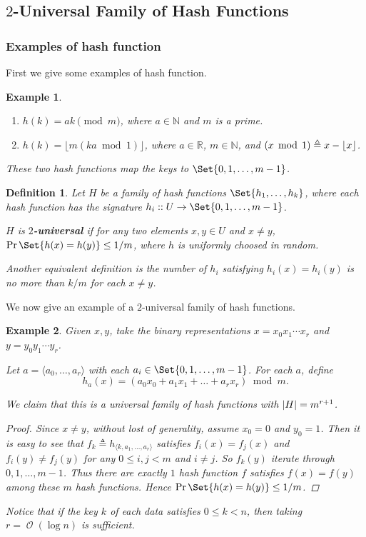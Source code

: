 \documentclass[12pt, a4paper]{article}
\DeclarePairedDelimiter{\abs}{\lvert}{\rvert}
\DeclarePairedDelimiter{\floor}{\lfloor}{\rfloor}
\newcommand{\ord}{\operatorname{\mathcal{O}}}
\newcommand{\defeq}{\triangleq}
\DeclareMathOperator{\mmod}{\;mod\;}
\theoremstyle{mystyle} %
\newtheorem{definition}{Definition}
\newtheorem{example}{Example}
\begin{document}
\subsection{$2$-Universal Family of Hash Functions}

\subsubsection{Examples of hash function}
First we give some examples of hash function.

\begin{example} \hfill
\begin{enumerate}
  \item $h(k) = a k \pmod{m}$, where $a \in \mathbb{N}$ and $m$ is a prime.
  \item $h(k) = \lfloor m (k a \mmod 1) \rfloor$, where $a \in \mathbb{R}$, $m \in \mathbb{N}$,
    and $(x \mmod 1) \defeq x - \floor{x}$.
\end{enumerate}
These two hash functions map the keys to $\Set{0, 1, \dots, m-1}$.
\end{example}

\smallskip

\begin{definition}
  Let $H$ be a family of hash functions $\Set{ h_1, \dots, h_k }$,
  where each hash function has the signature $h_i :: U \to \Set{0, 1, \dots, m-1}$.

  $H$ is {\bf $2$-universal} if for any two elements $x, y \in U$ and $x \neq y$, $\Pr\Set{ h(x) = h(y) } \leq 1/m$,
  where $h$ is uniformly choosed in random.

  Another equivalent definition is
  the number of $h_i$ satisfying $h_i(x) = h_i(y)$ is no more than $k / m$ for each $x \neq y$.
\end{definition}

We now give an example of a $2$-universal family of hash functions.

\begin{example}
  Given $x, y$, take the binary representations
  $x = x_0 x_1 \dotsm x_r$ and $y = y_0 y_1 \dotsm y_r$.

  Let $a = \langle a_0, \dots, a_r \rangle$ with each $a_i \in \Set{0, 1, \dots, m-1}$.
  For each $a$, define
  \[ h_a(x) = (a_0 x_0 + a_1 x_1 + \dots + a_r x_r) \mmod m. \]

  We claim that this is a universal family of hash functions with $\abs{H} = m^{r+1}$.

  \begin{proof}
    Since $x \neq y$, without lost of generality, assume $x_0 = 0$ and $y_0 = 1$.
    Then it is easy to see that $f_k \triangleq h_{\langle k, a_1, \dots, a_r \rangle}$
    satisfies $f_i(x) = f_j(x)$ and $f_i(y) \neq f_j(y)$ for any $0 \leq i, j < m$ and $i \neq j$.
    So $f_k(y)$ iterate through $0, 1, \dots, m-1$. Thus there are exactly $1$ hash function $f$
    satisfies $f(x) = f(y)$ among these $m$ hash functions. Hence $\Pr\Set{ h(x) = h(y) } \leq 1/m$.
  \end{proof}

  Notice that if the key $k$ of each data satisfies $0 \leq k < n$, then taking
  $r = \ord(\log n)$ is sufficient.
\end{example}
\end{document}

